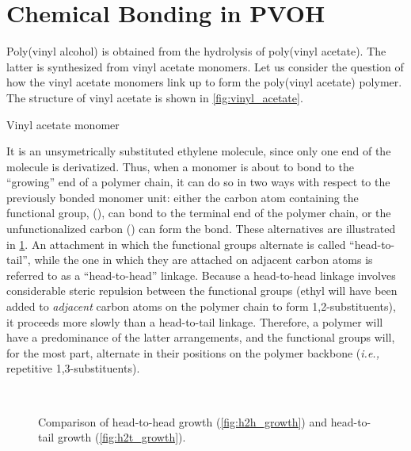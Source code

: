 \documentclass[nobib,nofonts,nols,nohyper]{tufte-handout}
\begin{document}

\section{Chemical Bonding in PVOH} %
\label{sec:chemical_bonding_in_pvoh}

Poly(vinyl alcohol) is obtained from the hydrolysis of poly(vinyl acetate). 
The latter is synthesized from vinyl acetate monomers. 
Let us consider the question of how the vinyl acetate monomers link up to form the poly(vinyl acetate) polymer. 
The structure of vinyl acetate is shown in \cref{fig:vinyl_acetate}.
\begin{marginfigure}
	\centering
	\caption{Vinyl acetate monomer}
	\label{fig:vinyl_acetate}
\end{marginfigure}
It is an unsymetrically substituted ethylene molecule, since only one end of the molecule is derivatized. 
Thus, when a monomer is about to bond to the ``growing'' end of a polymer chain, it can do so in two ways with respect to the previously bonded monomer unit: either the carbon atom containing the functional group,  (), can bond to the terminal end of the polymer chain, or the unfunctionalized carbon () can form the bond. 
These alternatives are illustrated in \cref{fig:growth_directions}. 
An attachment in which the functional groups alternate is called ``head-to-tail'', while the one in which they are attached on adjacent carbon atoms is referred to as a ``head-to-head'' linkage. 
Because a head-to-head linkage involves considerable steric repulsion between the functional groups (ethyl will have been added to \emph{adjacent} carbon atoms on the polymer chain to form 1,2-substituents), it proceeds more slowly than a head-to-tail linkage. 
Therefore, a polymer will have a predominance of the latter arrangements, and the functional groups will, for the most part, alternate in their positions on the polymer backbone (\emph{i.e.,} repetitive 1,3-substituents). 
\begin{figure}[htb]
	\captionsetup[subfigure]{farskip=20pt,captionskip=20pt}
	 \\
	\caption{Comparison of head-to-head growth (\cref{fig:h2h_growth}) and head-to-tail growth (\cref{fig:h2t_growth}).}
	\label{fig:growth_directions}
\end{figure}
\end{document}
